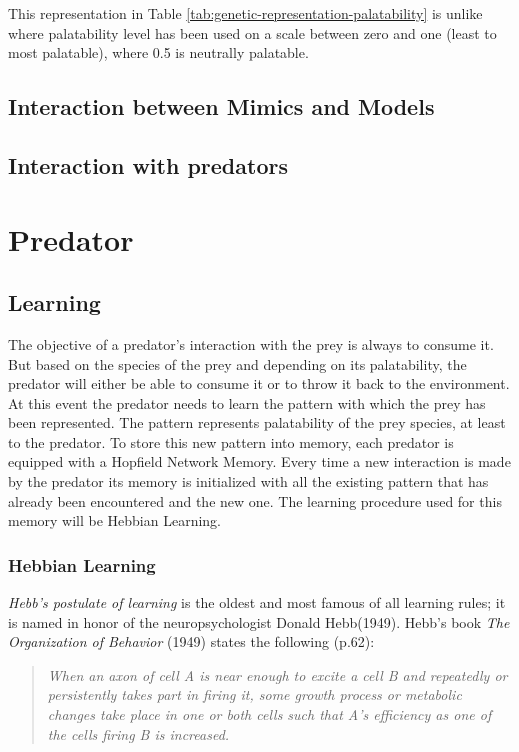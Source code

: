 This representation in Table \ref{tab:genetic-representation-palatability} is unlike \cite{franks2003} where palatability level has been used on a scale between zero and one (least to most palatable), where 0.5 is neutrally palatable. 

\subsection{Interaction between Mimics and Models}

\subsection{Interaction with predators}

\section{Predator}

\subsection{Learning}
The objective of a predator's interaction with the prey is always to consume it. But based on the species of the prey and depending on its palatability, the predator will either be able to consume it or to throw it back to the environment. At this event the predator needs to learn the pattern with which the prey has been represented. The pattern represents palatability of the prey species, at least to the predator. To store this new pattern into memory, each predator is equipped with a Hopfield Network Memory. Every time a new interaction is made by the predator its memory is initialized with all the existing pattern that has already been encountered and the new one. The learning procedure used for this memory will be Hebbian Learning. 

\subsubsection{Hebbian Learning}
\textit{Hebb's postulate of learning} is the oldest and most famous of all learning rules; it is named in honor of the neuropsychologist Donald Hebb(1949). Hebb's book \textit{The Organization of Behavior} (1949) states the following (p.62):

\begin{quote}
\textsl{When an axon of cell A is near enough to excite a cell B and repeatedly or persistently takes part in firing it, some growth process or metabolic changes take place in one or both cells such that A's efficiency as one of the cells firing B is increased.}
\end{quote}

